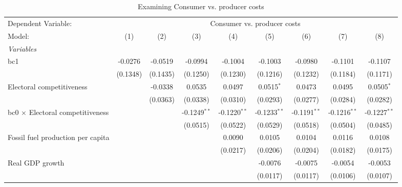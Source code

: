 
\begin{table}[htbp]
   \caption{Examining Consumer vs. producer costs}
   \centering
   \begin{tabular}{lcccccccc}
      \tabularnewline \midrule \midrule
      Dependent Variable: & \multicolumn{8}{c}{Consumer vs. producer costs}\\
      Model:                                  & (1)      & (2)      & (3)            & (4)            & (5)            & (6)            & (7)            & (8)\\  
      \midrule
      \emph{Variables}\\
      bc1                                     & -0.0276  & -0.0519  & -0.0994        & -0.1004        & -0.1003        & -0.0980        & -0.1101        & -0.1107\\   
                                              & (0.1348) & (0.1435) & (0.1250)       & (0.1230)       & (0.1216)       & (0.1232)       & (0.1184)       & (0.1171)\\   
      Electoral competitiveness               &          & -0.0338  & 0.0535         & 0.0497         & 0.0515$^{*}$   & 0.0473         & 0.0495         & 0.0505$^{*}$\\   
                                              &          & (0.0363) & (0.0338)       & (0.0310)       & (0.0293)       & (0.0277)       & (0.0284)       & (0.0282)\\   
      bc0 $\times$ Electoral competitiveness  &          &          & -0.1249$^{**}$ & -0.1220$^{**}$ & -0.1233$^{**}$ & -0.1191$^{**}$ & -0.1216$^{**}$ & -0.1227$^{**}$\\   
                                              &          &          & (0.0515)       & (0.0522)       & (0.0529)       & (0.0518)       & (0.0504)       & (0.0485)\\   
      Fossil fuel production per capita       &          &          &                & 0.0090         & 0.0105         & 0.0104         & 0.0116         & 0.0108\\   
                                              &          &          &                & (0.0217)       & (0.0206)       & (0.0204)       & (0.0182)       & (0.0175)\\   
      Real GDP growth                         &          &          &                &                & -0.0076        & -0.0075        & -0.0054        & -0.0053\\   
                                              &          &          &                &                & (0.0117)       & (0.0117)       & (0.0106)       & (0.0107)\\   

\end{tabular}
\end{table}
